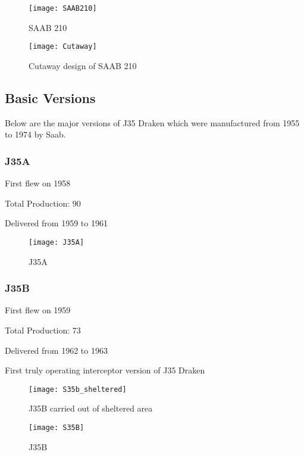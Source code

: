 \begin{figure}[H]
  \centering
  \texttt{[image: SAAB210]}
  \caption{SAAB 210}
\end{figure}
\begin{figure}[H]
  \centering
  \texttt{[image: Cutaway]}
  \caption{Cutaway design of SAAB 210}
\end{figure}

\subsection{Basic Versions}

Below are the major versions of J35 Draken which were manufactured from 1955
to 1974 by Saab.
\subsubsection{J35A}

    \begin{itemize*}
        \item First flew on 1958
        \item Total Production: 90
        \item Delivered from 1959 to 1961
    \end{itemize*}

\begin{figure}[H]
  \centering
  \texttt{[image: J35A]}
  \caption{J35A}
\end{figure}
\subsubsection{J35B}
\begin{itemize*}
        \item First flew on 1959
        \item Total Production: 73
        \item Delivered from 1962 to 1963
        \item First truly operating interceptor version of J35 Draken
    \end{itemize*}

\begin{figure}[H]
    \centering
    \texttt{[image: S35b\_sheltered]}
    \caption{J35B carried out of sheltered area}
\end{figure}

\begin{figure}[H]
    \centering
    \texttt{[image: S35B]}
    \caption{J35B}
\end{figure}

